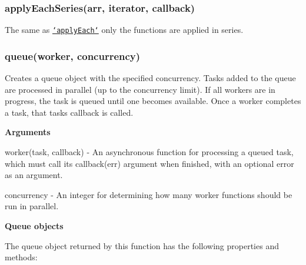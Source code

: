 \label{_applyEachSeries}%
 \subsubsection*{apply\+Each\+Series(arr, iterator, callback)}

The same as \href{#applyEach}{\tt `apply\+Each`} only the functions are applied in series. 



\label{_queue}%
 \subsubsection*{queue(worker, concurrency)}

Creates a {\ttfamily queue} object with the specified {\ttfamily concurrency}. Tasks added to the {\ttfamily queue} are processed in parallel (up to the {\ttfamily concurrency} limit). If all {\ttfamily worker}s are in progress, the task is queued until one becomes available. Once a {\ttfamily worker} completes a {\ttfamily task}, that {\ttfamily task}\textquotesingle{}s callback is called.

{\bfseries Arguments}


\begin{DoxyItemize}
\item {\ttfamily worker(task, callback)} -\/ An asynchronous function for processing a queued task, which must call its {\ttfamily callback(err)} argument when finished, with an optional {\ttfamily error} as an argument.
\item {\ttfamily concurrency} -\/ An {\ttfamily integer} for determining how many {\ttfamily worker} functions should be run in parallel.
\end{DoxyItemize}

{\bfseries Queue objects}

The {\ttfamily queue} object returned by this function has the following properties and methods\+:


